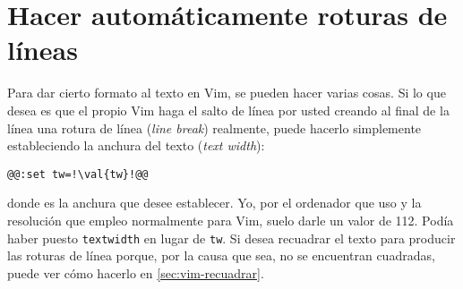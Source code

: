 \section{Hacer automáticamente roturas de líneas}\label{sec:vim-l-break}
Para dar cierto formato al texto en Vim, se pueden hacer varias cosas. Si lo que desea es que el propio Vim haga
el salto de línea por usted creando al final de la línea una rotura de línea
(\foreignlanguage{english}{\emph{line break}}) realmente, puede hacerlo simplemente estableciendo la anchura del
texto (\foreignlanguage{english}{\emph{text width}}):

\begin{lstlisting}[gobble=2,style=bashinteract,escapechar=!]
  @@:set tw=!\val{tw}!@@
\end{lstlisting}

\noindent donde  es la anchura que desee establecer. Yo, por el ordenador que uso y la resolución que
empleo normalmente para Vim, suelo darle un valor de 112. Podía haber puesto \lstinline+textwidth+ en lugar de
\lstinline+tw+. Si desea recuadrar el texto para producir las roturas de línea porque, por la causa que sea, no
se encuentran cuadradas, puede ver cómo hacerlo en \ref{sec:vim-recuadrar}.
